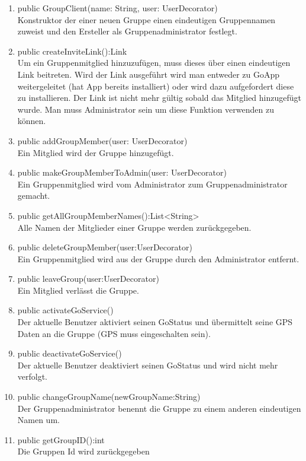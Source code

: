 \begin{enumerate}
	\item public GroupClient(name: String, user: UserDecorator)\\
		Konstruktor der einer neuen Gruppe einen eindeutigen Gruppennamen zuweist und den Ersteller als Gruppenadministrator festlegt.
	\item public createInviteLink():Link\\
		Um ein Gruppenmitglied hinzuzufügen, muss dieses über einen eindeutigen Link beitreten. Wird der Link ausgeführt wird man entweder zu GoApp weitergeleitet (hat App bereits installiert) oder wird dazu aufgefordert diese zu installieren. Der Link ist nicht mehr gültig sobald das Mitglied hinzugefügt wurde. Man muss Administrator sein um diese Funktion verwenden zu können.
	\item public addGroupMember(user: UserDecorator)\\
		Ein Mitglied wird der Gruppe hinzugefügt.
	\item public makeGroupMemberToAdmin(user: UserDecorator)\\
		Ein Gruppenmitglied wird vom Administrator zum Gruppenadministrator gemacht.
	\item public getAllGroupMemberNames():List<String>\\
		Alle Namen der Mitglieder einer Gruppe werden zurückgegeben.
	\item public deleteGroupMember(user:UserDecorator)\\
		Ein Gruppenmitglied wird aus der Gruppe durch den Administrator entfernt.
	\item public leaveGroup(user:UserDecorator)\\
		Ein Mitglied verlässt die Gruppe.
	\item public activateGoService()\\
		Der aktuelle Benutzer aktiviert seinen GoStatus und übermittelt seine GPS Daten an die Gruppe (GPS muss eingeschalten sein).
	\item public deactivateGoService()\\
		Der aktuelle Benutzer deaktiviert seinen GoStatus und wird nicht mehr verfolgt.
	\item public changeGroupName(newGroupName:String)\\
		Der Gruppenadministrator benennt die Gruppe zu einem anderen eindeutigen Namen um.
	\item public getGroupID():int \\
		Die Gruppen Id wird zurückgegeben

\end{enumerate}
